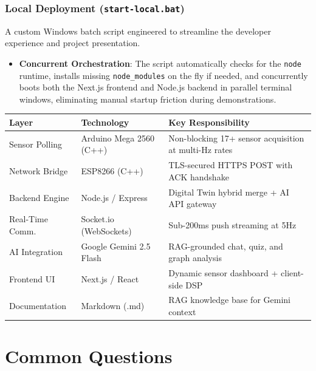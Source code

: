 \documentclass[12pt,a4paper]{article}
\newcommand{\Q}[1]{\textcolor{questioncolor}{\textbf{#1}}}
\newcommand{\codeinline}[1]{\texttt{\small #1}}
\begin{document}
\subsubsection*{Local Deployment (\codeinline{start-local.bat})}
A custom Windows batch script engineered to streamline the developer experience and project presentation.
\begin{itemize}
    \item \Q{Concurrent Orchestration}: The script automatically checks for the \texttt{node} runtime, installs missing \texttt{node\_modules} on the fly if needed, and concurrently boots both the Next.js frontend and Node.js backend in parallel terminal windows, eliminating manual startup friction during demonstrations.
\end{itemize}

\vspace{0.5cm}


\vspace{0.5cm}
\begin{tcolorbox}[conceptbox, title=\faTable\; Quick-Reference: Tech Stack \& Responsibilities]
\renewcommand{\arraystretch}{1.3}
\begin{tabular}{p{2.8cm} p{3.0cm} p{5.5cm}}
  \toprule
  \textbf{Layer} & \textbf{Technology} & \textbf{Key Responsibility} \\
  \midrule
  Sensor Polling  & Arduino Mega 2560 (C++) & Non-blocking 17+ sensor acquisition at multi-Hz rates \\
  Network Bridge  & ESP8266 (C++)           & TLS-secured HTTPS POST with ACK handshake \\
  Backend Engine  & Node.js / Express       & Digital Twin hybrid merge + AI API gateway \\
  Real-Time Comm. & Socket.io (WebSockets)  & Sub-200ms push streaming at 5Hz \\
  AI Integration  & Google Gemini 2.5 Flash & RAG-grounded chat, quiz, and graph analysis \\
  Frontend UI     & Next.js / React         & Dynamic sensor dashboard + client-side DSP \\
  Documentation   & Markdown (.md)          & RAG knowledge base for Gemini context \\
  \bottomrule
\end{tabular}
\end{tcolorbox}
\vspace{0.3cm}
\section*{Common Questions}
\end{document}

